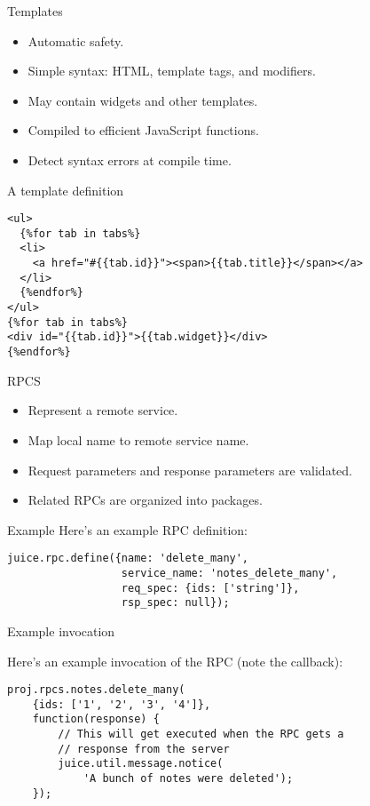 \documentclass{beamer}
\begin{document}
\begin{frame}{Templates}
  \begin{itemize}
  \item Automatic safety.
  \item Simple syntax: HTML, template tags, and modifiers.
  \item May contain widgets and other templates.
  \item Compiled to efficient JavaScript functions.
  \item Detect syntax errors at compile time.
  \end{itemize}
\end{frame}

\begin{frame}[fragile]{A template definition}
\begin{verbatim}
<ul>
  {%for tab in tabs%}
  <li>
    <a href="#{{tab.id}}"><span>{{tab.title}}</span></a>
  </li>
  {%endfor%}
</ul>
{%for tab in tabs%}
<div id="{{tab.id}}">{{tab.widget}}</div>
{%endfor%}
\end{verbatim}
\end{frame}

\begin{frame}{RPCS}
  \begin{itemize}
  \item Represent a remote service.
  \item Map local name to remote service name.
  \item Request parameters and response parameters are validated.
  \item Related RPCs are organized into packages.
  \end{itemize}
\end{frame}

\begin{frame}[fragile]{Example}
Here's an example RPC definition:
\begin{verbatim}
juice.rpc.define({name: 'delete_many',
                  service_name: 'notes_delete_many',
                  req_spec: {ids: ['string']},
                  rsp_spec: null});
\end{verbatim}
\end{frame}

\begin{frame}[fragile]{Example invocation}

Here's an example invocation of the RPC (note the callback):
\begin{verbatim}
proj.rpcs.notes.delete_many(
    {ids: ['1', '2', '3', '4']},
    function(response) {
        // This will get executed when the RPC gets a
        // response from the server
        juice.util.message.notice(
            'A bunch of notes were deleted');
    });
\end{verbatim}
\end{frame}
\end{document}
